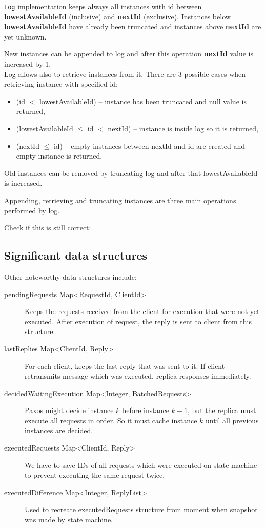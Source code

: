 \texttt{Log} implementation keeps always all instances with id between \textbf{lowestAvailableId} (inclusive) and \textbf{nextId} (exclusive). Instances below \textbf{lowestAvailableId} have already been truncated and instances above \textbf{nextId} are yet unknown.

New instances can be appended to log and after this operation \textbf{nextId} value is increased by 1. \\Log allows also to retrieve instances from it. There are 3 possible cases when retrieving instance with specified id:
\begin{itemize}
  \item (id $<$ lowestAvailableId) -- instance has been truncated and null value is returned,
  \item (lowestAvailableId $\leq$ id $<$ nextId) -- instance is inside log so it is returned,
  \item (nextId $\leq$ id) -- empty instances between nextId and id are created and empty instance is returned.
\end{itemize}
Old instances can be removed by truncating log and after that lowestAvailableId is increased. 

Appending, retrieving and truncating instances are three main operations performed by log.

Check if this is still correct:

\subsection{Significant data structures}
Other noteworthy data structures include:
\label{subsubsec:significant_structures}
  \begin{description}
    \item[pendingRequests Map\textless RequestId, ClientId\textgreater] Keeps the requests received from the client for execution that were not yet executed. After execution of request, the reply is sent to client from this structure.
    \item[lastReplies Map\textless ClientId, Reply\textgreater] For each client, keeps the last reply that was sent to it. If client retransmits message which was executed, replica responses immediately.
    \item[decidedWaitingExecution Map\textless Integer, BatchedRequests\textgreater] Paxos might decide instan\-ce $k$ before instance $k-1$, but the replica must execute all requests in order. So it must cache instance $k$ until all previous instances are decided.
    \item[executedRequests Map\textless ClientId, Reply\textgreater] We have to save IDs of all requests which were executed on state machine to prevent executing the same request twice.
	\item[executedDifference Map\textless Integer, ReplyList\textgreater] Used to recreate executedRequests structu\-re from moment when snapshot was made by state machine.
  \end{description}




